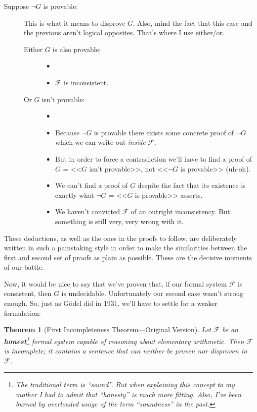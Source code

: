 \documentclass{article}
\newtheorem{theorem}{Theorem}
\newcommand{\F}{\ensuremath{\mathcal{F}}}
\begin{document}
\begin{description}
\begin{description}
\begin{itemize}
\end{itemize}
\end{description}
\item[Suppose $\neg G$ is provable:]
This is what it means to disprove $G$. Also, mind the fact that this case and the previous aren't logical opposites. That's where I use either/or.
\begin{description}
\item[Either $G$ is also provable:]
\begin{itemize}
\item[]
\item $\F$ is inconsistent.
\end{itemize}
\item[Or $G$ isn't provable:]
\begin{itemize}
\item[]
\item Because $\neg G$ is provable there exists some concrete proof of $\neg G$ which we can write out \textit{inside} $\F$.
\item But in order to force a contradiction we'll have to find a proof of $G$ = <<$G$ isn't provable>>, not <<$\neg G$ is provable>> (uh-oh).
\item We can't find a proof of $G$ despite the fact that its existence is exactly what $\neg G$ = <<$G$ is provable>> asserts.
\item We haven't convicted $\F$ of an outright inconsistency. But something is still very, very wrong with it.
\end{itemize}
\end{description}
\end{description}

These deductions, as well as the ones in the proofs to follow, are deliberately written in such a painstaking style in order to make the similarities between the first and second set of proofs as plain as possible. These are the decisive moments of our battle.

Now, it would be nice to say that we've proven that, if our formal system $\F$ is consistent, then $G$ is undecidable. Unfortunately our second case wasn't strong enough. So, just as Gödel did in 1931, we'll have to settle for a weaker formulation:

\begin{theorem}[First Incompleteness Theorem---Original Version]
Let $\F$ be an \textbf{honest}\footnote{The traditional term is ``\textit{sound}''. But when explaining this concept to my mother I had to admit that ``honesty'' is much more fitting. Also, I've been burned by overloaded usage of the term ``soundness'' in the past.} formal system capable of reasoning about elementary arithmetic. Then $\F$ is incomplete; it contains a sentence that can neither be proven nor disproven in $\F$.
\end{theorem}
\end{document}
